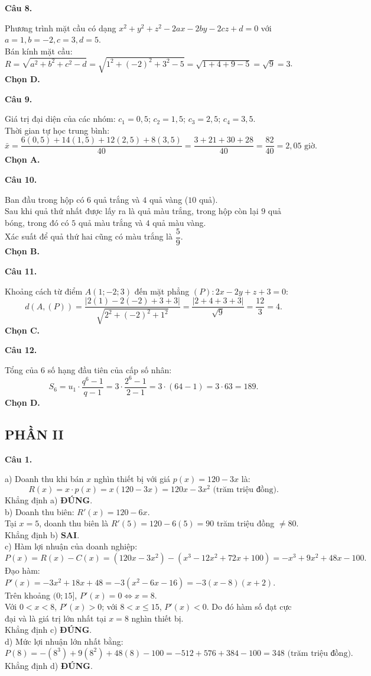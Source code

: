 \documentclass[12pt,a4paper]{article}
\newcommand{\loigiai}[1]{\par\medskip\Needspace{4\baselineskip}\noindent\textbf{#1}\par\nobreak}
\begin{document}
\loigiai{Câu 8.}
Phương trình mặt cầu có dạng $x^2 + y^2 + z^2 - 2ax - 2by - 2cz + d = 0$ với $a = 1, b = -2, c = 3, d = 5$.\\
Bán kính mặt cầu: $R = \sqrt{a^2 + b^2 + c^2 - d} = \sqrt{1^2 + (-2)^2 + 3^2 - 5} = \sqrt{1 + 4 + 9 - 5} = \sqrt{9} = 3$.\\
\textbf{Chọn D.}

\loigiai{Câu 9.}
Giá trị đại diện của các nhóm:
$c_1 = 0{,}5$; $c_2 = 1{,}5$; $c_3 = 2{,}5$; $c_4 = 3{,}5$.\\
Thời gian tự học trung bình:
$$\bar{x} = \dfrac{6(0{,}5) + 14(1{,}5) + 12(2{,}5) + 8(3{,}5)}{40} = \dfrac{3 + 21 + 30 + 28}{40} = \dfrac{82}{40} = 2{,}05\text{ giờ}.$$
\textbf{Chọn A.}

\loigiai{Câu 10.}
Ban đầu trong hộp có $6$ quả trắng và $4$ quả vàng ($10$ quả).\\
Sau khi quả thứ nhất được lấy ra là quả màu trắng, trong hộp còn lại $9$ quả bóng, trong đó có $5$ quả màu trắng và $4$ quả màu vàng.\\
Xác suất để quả thứ hai cũng có màu trắng là $\dfrac{5}{9}$.\\
\textbf{Chọn B.}

\loigiai{Câu 11.}
Khoảng cách từ điểm $A(1; -2; 3)$ đến mặt phẳng $(P): 2x - 2y + z + 3 = 0$:
$$d(A, (P)) = \dfrac{|2(1) - 2(-2) + 3 + 3|}{\sqrt{2^2 + (-2)^2 + 1^2}} = \dfrac{|2 + 4 + 3 + 3|}{\sqrt{9}} = \dfrac{12}{3} = 4.$$
\textbf{Chọn C.}

\loigiai{Câu 12.}
Tổng của $6$ số hạng đầu tiên của cấp số nhân:
$$S_6 = u_1 \cdot \dfrac{q^6 - 1}{q - 1} = 3 \cdot \dfrac{2^6 - 1}{2 - 1} = 3 \cdot (64 - 1) = 3 \cdot 63 = 189.$$
\textbf{Chọn D.}

\subsection*{PHẦN II}

\loigiai{Câu 1.}
a) Doanh thu khi bán $x$ nghìn thiết bị với giá $p(x) = 120 - 3x$ là:
$$R(x) = x \cdot p(x) = x(120 - 3x) = 120x - 3x^2\text{ (trăm triệu đồng)}.$$
Khẳng định a) \textbf{ĐÚNG}.\\
b) Doanh thu biên: $R'(x) = 120 - 6x$.\\
Tại $x = 5$, doanh thu biên là $R'(5) = 120 - 6(5) = 90$ trăm triệu đồng $\ne 80$.\\
Khẳng định b) \textbf{SAI}.\\
c) Hàm lợi nhuận của doanh nghiệp:
$$P(x) = R(x) - C(x) = (120x - 3x^2) - (x^3 - 12x^2 + 72x + 100) = -x^3 + 9x^2 + 48x - 100.$$
Đạo hàm: $P'(x) = -3x^2 + 18x + 48 = -3(x^2 - 6x - 16) = -3(x - 8)(x + 2)$.\\
Trên khoảng $(0; 15]$, $P'(x) = 0 \iff x = 8$.\\
Với $0 < x < 8$, $P'(x) > 0$; với $8 < x \le 15$, $P'(x) < 0$. Do đó hàm số đạt cực đại và là giá trị lớn nhất tại $x = 8$ nghìn thiết bị.\\
Khẳng định c) \textbf{ĐÚNG}.\\
d) Mức lợi nhuận lớn nhất bằng:
$$P(8) = -(8^3) + 9(8^2) + 48(8) - 100 = -512 + 576 + 384 - 100 = 348\text{ (trăm triệu đồng)}.$$
Khẳng định d) \textbf{ĐÚNG}.
\end{document}

